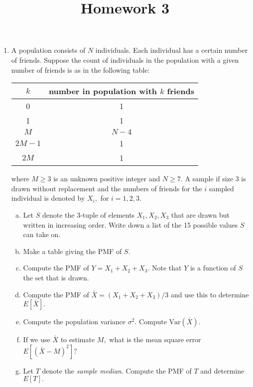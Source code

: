 \documentclass{article}
\newcommand{\var}{\mathrm{Var}}
\begin{document}
\title{Homework 3}
\maketitle
\thispagestyle{fancy}

\begin{enumerate}
	\item A population consists of $N$ individuals. Each individual has a certain number of friends. Suppose the count of individuals in the population with a given number of friends is as in the following table:
		\begin{center}
			\begin{tabular}{c|c}
				$k$ & number in population with $k$ friends \\
				\hline 
				0 & 1 \\
				1 & 1 \\
				$M$ & $N-4$ \\
				$2M-1$ & 1 \\
				$2M$ & 1
			\end{tabular}
		\end{center}
		where $M\ge3$ is an unknown positive integer and $N\ge7.$ A sample if size 3 is drawn without replacement and the numbers of friends for the $i$ sampled individual is denoted by $X_i,$ for $i=1, 2, 3.$

		\begin{enumerate}[(a)]
			\item Let $S$ denote the 3-tuple of elements $X_1, X_2, X_3$ that are drawn but written in increasing order. Write down a list of the 15 possible values $S$ can take on.

			\item Make a table giving the PMF of $S.$

			\item Compute the PMF of $Y=X_1+X_2+X_3.$ Note that $Y$ is a function of $S$ the set that is drawn.

			\item Compute the PMF of $\bar{X}=(X_1+X_2+X_3)/3$ and use this to determine $E[\bar{X}].$

			\item Compute the population variance $\sigma^2.$ Compute $\var(\bar{X}).$ 

			\item If we use $\bar{X}$ to estimate $M,$ what is the mean square error $E[(\bar{X}-M)^2]?$

			\item Let $T$ denote the \textit{sample median}. Compute the PMF of $T$ and determine $E[T].$


\end{enumerate}
\end{enumerate}
\end{document}
